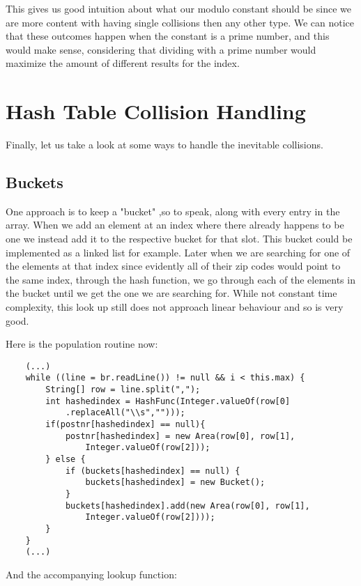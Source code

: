 \documentclass[a4paper,11pt]{article}
\begin{document}
This gives us good intuition about what our modulo constant should be since we are more content with having single collisions then any other type. We can notice that these outcomes happen when the constant is a prime number, and this would make sense, considering that dividing with a prime number would maximize the amount of different results for the index.

\section*{Hash Table Collision Handling}

Finally, let us take a look at some ways to handle the inevitable collisions.

\subsection*{Buckets}
One approach is to keep a "bucket" ,so to speak, along with every entry in the array. When we add an element at an index where there already happens to be one we instead add it to the respective bucket for that slot. This bucket could be implemented as a linked list for example. Later when we are searching for one of the elements at that index since evidently all of their zip codes would point to the same index, through the hash function, we go through each of the elements in the bucket until we get the one we are searching for. While not constant time complexity, this look up still does not approach linear behaviour and so is very good.

Here is the population routine now:
\begin{verbatim}
    (...)
    while ((line = br.readLine()) != null && i < this.max) {
        String[] row = line.split(",");
        int hashedindex = HashFunc(Integer.valueOf(row[0]
            .replaceAll("\\s","")));
        if(postnr[hashedindex] == null){
            postnr[hashedindex] = new Area(row[0], row[1],
                Integer.valueOf(row[2]));
        } else {
            if (buckets[hashedindex] == null) {
                buckets[hashedindex] = new Bucket();
            }
            buckets[hashedindex].add(new Area(row[0], row[1],
                Integer.valueOf(row[2])));
        }
    }
    (...)
\end{verbatim}

And the accompanying lookup function:
\end{document}
